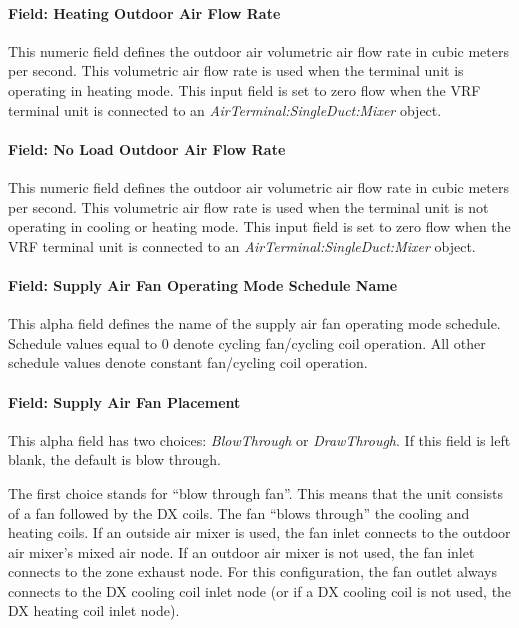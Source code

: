 \paragraph{Field: Heating Outdoor Air Flow Rate}\label{field-heating-outdoor-air-flow-rate-3}

This numeric field defines the outdoor air volumetric air flow rate in cubic meters per second. This volumetric air flow rate is used when the terminal unit is operating in heating mode. This input field is set to zero flow when the VRF terminal unit is connected to an \textit{AirTerminal:SingleDuct:Mixer} object.

\paragraph{Field: No Load Outdoor Air Flow Rate}\label{field-no-load-outdoor-air-flow-rate-2}

This numeric field defines the outdoor air volumetric air flow rate in cubic meters per second. This volumetric air flow rate is used when the terminal unit is not operating in cooling or heating mode. This input field is set to zero flow when the VRF terminal unit is connected to an \textit{AirTerminal:SingleDuct:Mixer} object.

\paragraph{Field: Supply Air Fan Operating Mode Schedule Name}\label{field-supply-air-fan-operating-mode-schedule-name-7}

This alpha field defines the name of the supply air fan operating mode schedule. Schedule values equal to 0 denote cycling fan/cycling coil operation. All other schedule values denote constant fan/cycling coil operation.

\paragraph{Field: Supply Air Fan Placement}\label{field-supply-air-fan-placement-000}

This alpha field has two choices: \textit{BlowThrough} or \textit{DrawThrough}. If this field is left blank, the default is blow through.

The first choice stands for ``blow through fan''. This means that the unit consists of a fan followed by the DX coils. The fan ``blows through'' the cooling and heating coils. If an outside air mixer is used, the fan inlet connects to the outdoor air mixer's mixed air node. If an outdoor air mixer is not used, the fan inlet connects to the zone exhaust node. For this configuration, the fan outlet always connects to the DX cooling coil inlet node (or if a DX cooling coil is not used, the DX heating coil inlet node).

